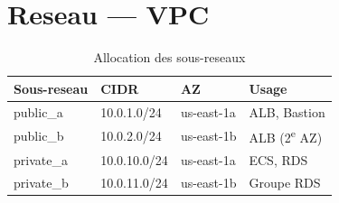 \section{Reseau --- VPC}

\begin{table}[H]
    \centering
    \begin{tabular}{llll}
        \toprule
        \textbf{Sous-reseau} & \textbf{CIDR} & \textbf{AZ} & \textbf{Usage} \\
        \midrule
        public\_a & 10.0.1.0/24 & us-east-1a & ALB, Bastion \\
        public\_b & 10.0.2.0/24 & us-east-1b & ALB (2\textsuperscript{e} AZ) \\
        private\_a & 10.0.10.0/24 & us-east-1a & ECS, RDS \\
        private\_b & 10.0.11.0/24 & us-east-1b & Groupe RDS \\
        \bottomrule
    \end{tabular}
    \caption{Allocation des sous-reseaux}
\end{table}

